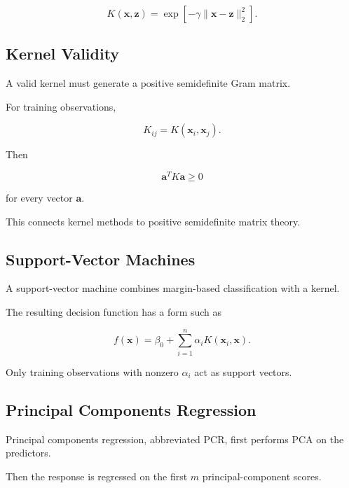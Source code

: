 \[
\boxed{
K(\mathbf{x},\mathbf{z})
=
\exp
\left[
-\gamma
\|
\mathbf{x}-\mathbf{z}
\|_2^2
\right].
}
\]

\subsection{Kernel Validity}
\label{subsec:kernel-validity}

A valid kernel must generate a positive semidefinite Gram matrix.

For training observations,

\[
\boxed{
K_{ij}
=
K
(
\mathbf{x}_i,
\mathbf{x}_j
).
}
\]

Then

\[
\boxed{
\mathbf{a}^TK\mathbf{a}
\geq0
}
\]

for every vector \(\mathbf{a}\).

This connects kernel methods to positive semidefinite matrix theory.

\subsection{Support-Vector Machines}
\label{subsec:support-vector-machines}

A support-vector machine combines margin-based classification with a
kernel.

The resulting decision function has a form such as

\[
\boxed{
f(\mathbf{x})
=
\beta_0
+
\sum_{i=1}^{n}
\alpha_i
K
(
\mathbf{x}_i,
\mathbf{x}
).
}
\]

Only training observations with nonzero \(\alpha_i\) act as support
vectors.

\subsection{Principal Components Regression}
\label{subsec:principal-components-regression}

Principal components regression, abbreviated PCR, first performs PCA on
the predictors.

Then the response is regressed on the first \(m\) principal-component
scores.

